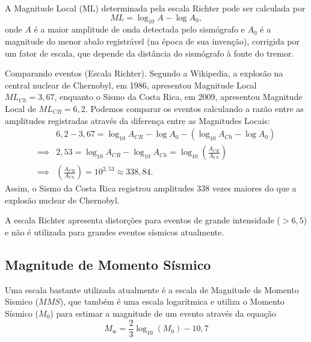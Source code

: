 A Magnitude Local (ML) determinada pela escala Richter pode ser calculada por
$$
ML = \log_{10} A - \log A_0,
$$
onde $A$ é a maior amplitude de onda detectada pelo sismógrafo e $A_0$ é a magnitude do menor abalo registrável (na época de sua invenção), corrigida por um fator de escala, que depende da distância do sismógrafo à fonte do tremor.


\begin{example}{Comparando eventos (Escala Richter).}
Segundo a Wikipedia, a explosão na central nuclear de Chernobyl, em 1986, apresentou Magnitude Local $ML_{Ch} = 3{,}67$, enquanto o Sismo da Costa Rica, em 2009, apresentou Magnitude Local de $ML_{CR}=6{,}2$. Podemos comparar os eventos calculando a razão entre as amplitudes registradas através da diferença entre as Magnitudes Locais:
\begin{align*}
&6{,}2-3{,}67 = \log_{10} A_{CR} - \log A_0 - (\log_{10} A_{Ch} - \log A_0)\\
\implies & 2{,}53 = \log_{10} A_{CR} - \log_{10} A_{Ch} = \log_{10} \left(\frac{A_{CR}}{A_{Ch}}\right)\\
\implies & \left(\frac{A_{CR}}{A_{Ch}}\right) = 10^{2{,}53} \approx 338{,}84.
\end{align*} 
Assim, o Sismo da Costa Rica registrou amplitudes 338 vezes maiores do que a explosão nuclear de Chernobyl.
\end{example}

A escala Richter apresenta distorções para eventos de grande intensidade ($>6{,}5$) e não é utilizada para grandes eventos sísmicos atualmente.

\subsection{Magnitude de Momento Sísmico}\label{EscalaMMS}

Uma escala bastante utilizada atualmente é a escala de Magnitude ds Momento Sísmico ($MMS$), que também é uma escala logarítmica e utiliza o Momento Sísmico ($M_0$) para estimar a magnitude de um evento através da equação
$$
M_{\mathrm {w} }={\frac{2}{3}}\log_{10}\left(M_{0}\right)-10,7
$$

